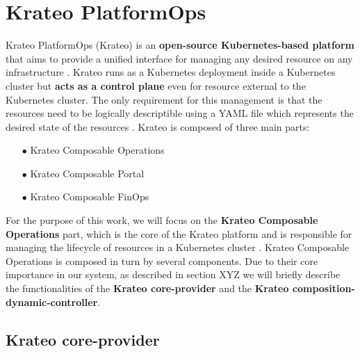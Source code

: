 \section{Krateo PlatformOps}
\label{sec:krateo}

Krateo PlatformOps (Krateo) is an \textbf{open-source Kubernetes-based platform} that aims to provide a unified interface for managing any desired resource on any infrastructure \cite{krateo_docs}.
Krateo runs as a Kubernetes deployment inside a Kubernetes cluster but \textbf{acts as a control plane} even for resource external to the Kubernetes cluster.
The only requirement for this management is that the resources need to be logically descriptible using a YAML file which represents the desired state of the resources \cite{krateo_docs}.
Krateo is composed of three main parts:
\begin{itemize}[itemsep=0.2pt, topsep=1pt]
    \item[$\bullet$] Krateo Composable Operations
    \item[$\bullet$] Krateo Composable Portal
    \item[$\bullet$] Krateo Composable FinOps
\end{itemize}

For the purpose of this work, we will focus on the \textbf{Krateo Composable Operations} part, which is the core of the Krateo platform and is responsible for managing the lifecycle of resources in a Kubernetes cluster \cite{krateo_docs}.
Krateo Composable Operations is composed in turn by several components. Due to their core importance in our system, as described in section XYZ we will briefly describe the functionalities of the \textbf{Krateo core-provider} and the \textbf{Krateo composition-dynamic-controller}.

\subsection{Krateo core-provider}

